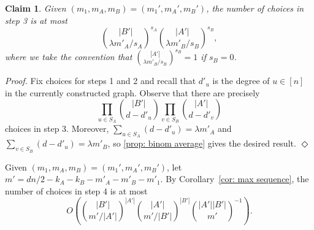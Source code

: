 \documentclass[11pt]{article}
\newenvironment{proofclaim}[1][]%
{\noindent \emph{Proof.} {}{#1}{}}{\hfill
	$\Diamond$\vspace{1em}}
\theoremstyle{plain}
\newtheorem{claim}{Claim}[thm]
\begin{document}
\begin{claim}\label{clm: Janson 1 step 4}
Given $(m_1,m_A,m_B)=(m_1',m_A',m_B')$,
the number of choices in step 3 is at most
\[
    \binom{|B'|}{\lambda m'_A/s_A}^{s_A}\binom{|A'|}{\lambda m'_B/s_B}^{s_B},
    \]
where we take the convention that $\binom{|A'|}{\lambda m'_B/s_B}^{s_B} = 1$ if $s_B = 0$.
\end{claim}
\begin{proofclaim}
    Fix choices for steps 1 and 2 and recall that $d'_u$ is the degree of $u \in [n]$ in the currently constructed graph. Observe that there are precisely
    \[
    \prod_{u \in S_A}\binom{|B'|}{d - d'_u}\prod_{v \in S_B}\binom{|A'|}{d - d'_v}
    \]
    choices in step 3. Moreover, $\sum_{u \in S_A}(d - d'_u) = \lambda m'_A$ and $\sum_{v \in S_B}(d - d'_u) = \lambda m'_B$, so \cref{prop: binom average} gives the desired result.
\end{proofclaim}


Given $(m_1,m_A,m_B)=(m_1',m_A',m_B')$,
let $m' = dn/2 - k_A - k_B - m'_A - m'_B - m'_1$. By Corollary~\ref{cor: max sequence}, the number of choices in step 4 is at most
\begin{equation}
O\left(\binom{|B'|}{m'/|A'|}^{|A'|}\binom{|A'|}{m'/|B'|}^{|B'|}\binom{|A'||B'|}{m'}^{-1}\right). \label{eq:step5}
\end{equation}
\end{document}

